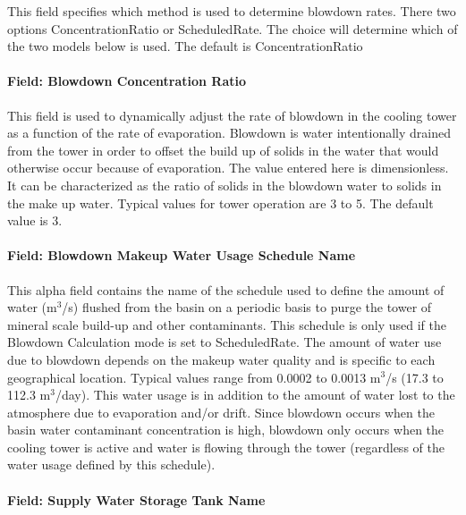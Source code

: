 This field specifies which method is used to determine blowdown rates. There two options ConcentrationRatio or ScheduledRate. The choice will determine which of the two models below is used. The default is ConcentrationRatio

\paragraph{Field: Blowdown Concentration Ratio}\label{field-blowdown-concentration-ratio-1}

This field is used to dynamically adjust the rate of blowdown in the cooling tower as a function of the rate of evaporation. Blowdown is water intentionally drained from the tower in order to offset the build up of solids in the water that would otherwise occur because of evaporation. The value entered here is dimensionless. It can be characterized as the ratio of solids in the blowdown water to solids in the make up water. Typical values for tower operation are 3 to 5. The default value is 3.

\paragraph{Field: Blowdown Makeup Water Usage Schedule Name}\label{field-blowdown-makeup-water-usage-schedule-name-1}

This alpha field contains the name of the schedule used to define the amount of water (m\(^{3}\)/s) flushed from the basin on a periodic basis to purge the tower of mineral scale build-up and other contaminants. This schedule is only used if the Blowdown Calculation mode is set to ScheduledRate. The amount of water use due to blowdown depends on the makeup water quality and is specific to each geographical location. Typical values range from 0.0002 to 0.0013 m\(^{3}\)/s (17.3 to 112.3 m\(^{3}\)/day). This water usage is in addition to the amount of water lost to the atmosphere due to evaporation and/or drift. Since blowdown occurs when the basin water contaminant concentration is high, blowdown only occurs when the cooling tower is active and water is flowing through the tower (regardless of the water usage defined by this schedule).

\paragraph{Field: Supply Water Storage Tank Name}\label{field-supply-water-storage-tank-name-1}

